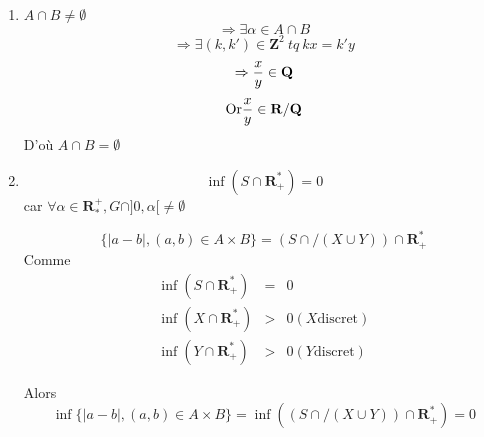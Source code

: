 \documentclass[11pt,a4paper,fleqn]{article}
\begin{document}
		
		\item
			\begin{enumerate}
				\item
					$A \cap B \neq \emptyset$
					\[\Rightarrow \exists \alpha \in A \cap B\]
					\[\Rightarrow \exists (k, k') \in \mathbf{Z}^2 ~tq~ k x = k' y\]
					\[\Rightarrow {x \over y} \in \mathbf{Q}\]
					\[\textrm{Or} {x \over y} \in \mathbf{R} / \mathbf{Q}\]
					D'o\`u $A \cap B = \emptyset$
				
				\item
					\[\inf(S \cap \mathbf{R^*_+}) = 0\]
					car $\forall \alpha \in \mathbf{R^+_*}, G \cap \rbrack 0, \alpha \lbrack \neq \emptyset$
					
					\[\lbrace |a-b|,(a,b)\in A \times B\rbrace = (S \cap /(X \cup Y)) \cap \mathbf{R^*_+}\] 
					Comme
					\begin{eqnarray*}
						\inf(S \cap \mathbf{R^*_+}) & = & 0 \\
						\inf(X \cap \mathbf{R^*_+}) & > & 0 (X \mathrm{discret})\\
						\inf(Y \cap \mathbf{R^*_+}) & > & 0 (Y \mathrm{discret})
					\end{eqnarray*}
					
					Alors
					\[\inf \lbrace |a-b|,(a,b)\in A \times B\rbrace = \inf((S \cap /(X \cup Y)) \cap \mathbf{R^*_+}) = 0\]
	
							
			\end{enumerate}
			
\end{document}
